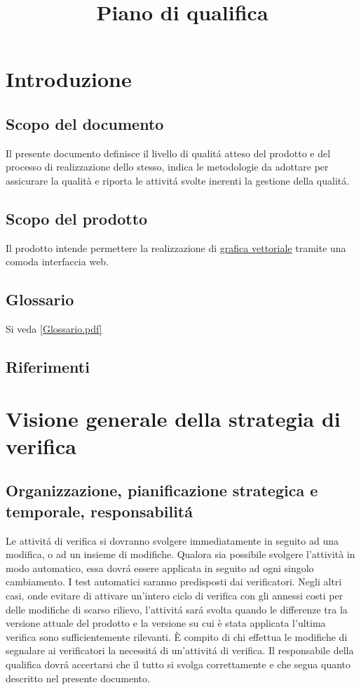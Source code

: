 \documentclass[a4paper]{article}
\begin{document}
\title{Piano di qualifica}


\section{Introduzione}

\subsection{Scopo del documento}
Il presente documento definisce il livello di qualit\'a atteso del prodotto e del processo di realizzazione dello stesso, indica le metodologie da adottare per assicurare la qualit\`a e riporta le attivit\'a svolte inerenti la gestione della qualit\'a.

\subsection{Scopo del prodotto}
Il prodotto intende permettere la realizzazione di \underline{grafica vettoriale} tramite una comoda interfaccia web.

\subsection{Glossario}
Si veda \ref{Glossario.pdf}

\subsection{Riferimenti}


\section{Visione generale della strategia di verifica}

\subsection{Organizzazione, pianificazione strategica e temporale, responsabilit\'a}
Le attivit\'a di verifica si dovranno svolgere immediatamente in seguito ad una modifica, o ad un insieme di modifiche. Qualora sia possibile svolgere l'attivit\`a in modo automatico, essa dovr\'a essere applicata in seguito ad ogni singolo cambiamento. I test automatici saranno predisposti dai verificatori. Negli altri casi, onde evitare di attivare un'intero ciclo di verifica con gli annessi costi per delle modifiche di scarso rilievo, l'attivit\'a sar\'a svolta quando le differenze tra la versione attuale del prodotto e la versione su cui \`e stata applicata l'ultima verifica sono sufficientemente rilevanti. \`E compito di chi effettua le modifiche di segnalare ai verificatori la necessit\'a di un'attivit\'a di verifica. Il responsabile della qualifica dovr\'a accertarsi che il tutto si svolga correttamente e che segua quanto descritto nel presente documento.
\end{document}

